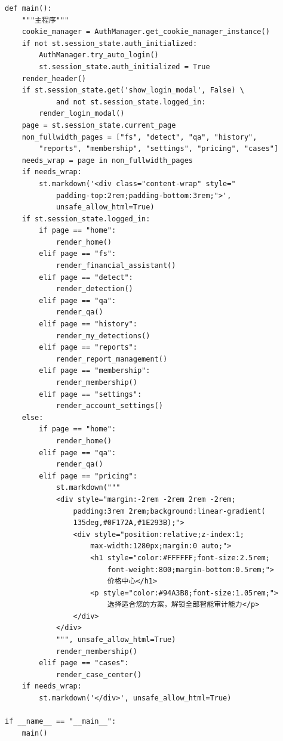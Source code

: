 \documentclass[a4paper,10pt]{article}
\begin{document}
\begin{lstlisting}
def main():
    """主程序"""
    cookie_manager = AuthManager.get_cookie_manager_instance()
    if not st.session_state.auth_initialized:
        AuthManager.try_auto_login()
        st.session_state.auth_initialized = True
    render_header()
    if st.session_state.get('show_login_modal', False) \
            and not st.session_state.logged_in:
        render_login_modal()
    page = st.session_state.current_page
    non_fullwidth_pages = ["fs", "detect", "qa", "history",
        "reports", "membership", "settings", "pricing", "cases"]
    needs_wrap = page in non_fullwidth_pages
    if needs_wrap:
        st.markdown('<div class="content-wrap" style="
            padding-top:2rem;padding-bottom:3rem;">',
            unsafe_allow_html=True)
    if st.session_state.logged_in:
        if page == "home":
            render_home()
        elif page == "fs":
            render_financial_assistant()
        elif page == "detect":
            render_detection()
        elif page == "qa":
            render_qa()
        elif page == "history":
            render_my_detections()
        elif page == "reports":
            render_report_management()
        elif page == "membership":
            render_membership()
        elif page == "settings":
            render_account_settings()
    else:
        if page == "home":
            render_home()
        elif page == "qa":
            render_qa()
        elif page == "pricing":
            st.markdown("""
            <div style="margin:-2rem -2rem 2rem -2rem;
                padding:3rem 2rem;background:linear-gradient(
                135deg,#0F172A,#1E293B);">
                <div style="position:relative;z-index:1;
                    max-width:1280px;margin:0 auto;">
                    <h1 style="color:#FFFFFF;font-size:2.5rem;
                        font-weight:800;margin-bottom:0.5rem;">
                        价格中心</h1>
                    <p style="color:#94A3B8;font-size:1.05rem;">
                        选择适合您的方案，解锁全部智能审计能力</p>
                </div>
            </div>
            """, unsafe_allow_html=True)
            render_membership()
        elif page == "cases":
            render_case_center()
    if needs_wrap:
        st.markdown('</div>', unsafe_allow_html=True)

if __name__ == "__main__":
    main()
\end{lstlisting}
\end{document}

